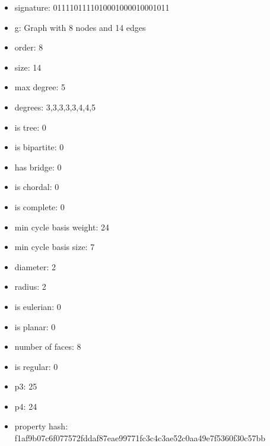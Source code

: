 \begin{itemize}
\item signature: 0111101111010001000010001011
\item g: Graph with 8 nodes and 14 edges
\item order: 8
\item size: 14
\item max degree: 5
\item degrees: 3,3,3,3,3,4,4,5
\item is tree: 0
\item is bipartite: 0
\item has bridge: 0
\item is chordal: 0
\item is complete: 0
\item min cycle basis weight: 24
\item min cycle basis size: 7
\item diameter: 2
\item radius: 2
\item is eulerian: 0
\item is planar: 0
\item number of faces: 8
\item is regular: 0
\item p3: 25
\item p4: 24
\item property hash: f1af9b07c6f077572fddaf87eae99771fc3c4c3ae52c0aa49e7f5360f30c57bb
\end{itemize}
\newpage
\begin{figure}
\end{figure}
